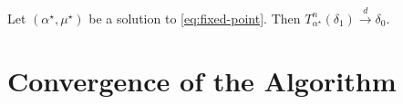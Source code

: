 \begin{lemma}
  Let $(\alpha^\star, \mu^\star)$ be a solution to \eqref{eq:fixed-point}. Then $T^n_{\alpha^\star}(\delta_1) \stackrel{d}{\to} \delta_0$.
\end{lemma}

\section{Convergence of the Algorithm}







